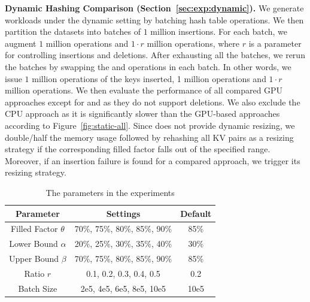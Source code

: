 

\vspace{1mm}\noindent\textbf{Dynamic Hashing Comparison (Section~\ref{sec:exp:dynamic}).}
We generate workloads under the dynamic setting by batching hash table operations.
We then partition the datasets into batches of $1$ million insertions. 
For each batch, we augment $1$ million  operations and $1 \cdot r$ million  operations,
where $r$ is a parameter for controlling insertions and deletions.
After exhausting all the batches, we rerun the batches by swapping the  and  operations in each batch. 
In other words, we issue $1$ million  operations of the keys inserted, 1 million  operations and $1 \cdot r$ million  operations.
We then evaluate the performance of all compared GPU approaches except for \cudpp and \warp as they do not support deletions. 
We also exclude the CPU approach as it is significantly slower than the GPU-based approaches according to Figure~\ref{fig:static-all}. 
Since \megakv does not provide dynamic resizing, we double/half the memory usage followed by rehashing all KV pairs as a resizing strategy if the corresponding filled factor falls out of the specified range. 
Moreover, if an insertion failure is found for a compared approach, we trigger its resizing strategy.

\begin{table}[t]
	\centering
	\caption{The parameters in the experiments}
	\vspace{-1em}
	\label{tbl:parameters}
	\begin{tabular}{|c|c|c|}
		\hline
		\textbf{Parameter} & \textbf{Settings} & \textbf{Default} \\ \hline
		Filled Factor	$\theta$  & 70\%, 75\%, 80\%, 85\%, 90\% & 85\% \\ \hline
		Lower Bound $\alpha$ & 20\%, 25\%, 30\%, 35\%, 40\% & 30\% \\ \hline
		Upper Bound	$\beta$  & 70\%, 75\%, 80\%, 85\%, 90\% & 85\% \\ \hline
		Ratio $r$ & 0.1, 0.2, 0.3, 0.4, 0.5 & 0.2 \\ \hline
		Batch Size & 2e5, 4e5, 6e5, 8e5, 10e5 & 10e5 \\ \hline
	\end{tabular}
\end{table}

